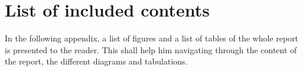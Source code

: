 \newpage
\section{List of included contents}
\label{appendix:contents}

In the following appendix, a list of figures and a list of tables of the whole report is presented to the reader. This shall help him navigating through the content of the report, the different diagrams and tabulations.

\listoftables
\listoffigures